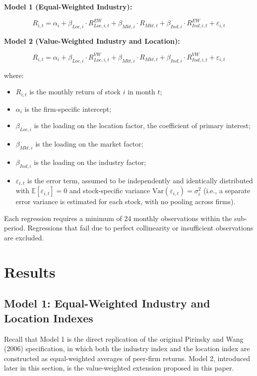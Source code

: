 \documentclass[
  12pt,
]{article}
\providecommand{\tightlist}{%
  \setlength{\itemsep}{0pt}\setlength{\parskip}{0pt}}
\begin{document}
\textbf{Model 1 (Equal-Weighted Industry):}

\[R_{i,t} = \alpha_i + \beta_{Loc,i} \cdot R_{Loc,i,t}^{EW} + \beta_{Mkt,i} \cdot R_{Mkt,t} + \beta_{Ind,i} \cdot R_{Ind,i,t}^{EW} + \varepsilon_{i,t} \tag{1}\]

\textbf{Model 2 (Value-Weighted Industry and Location):}

\[R_{i,t} = \alpha_i + \beta_{Loc,i} \cdot R_{Loc,i,t}^{VW} + \beta_{Mkt,i} \cdot R_{Mkt,t} + \beta_{Ind,i} \cdot R_{Ind,i,t}^{VW} + \varepsilon_{i,t} \tag{2}\]

\noindent where:

\begin{itemize}
\tightlist
\item
  \(R_{i,t}\) is the monthly return of stock \(i\) in month \(t\);
\item
  \(\alpha_i\) is the firm-specific intercept;
\item
  \(\beta_{Loc,i}\) is the loading on the location factor, the
  coefficient of primary interest;
\item
  \(\beta_{Mkt,i}\) is the loading on the market factor;
\item
  \(\beta_{Ind,i}\) is the loading on the industry factor;
\item
  \(\varepsilon_{i,t}\) is the error term, assumed to be independently
  and identically distributed with \(\mathbb{E}[\varepsilon_{i,t}] = 0\)
  and stock-specific variance
  \(\mathrm{Var}(\varepsilon_{i,t}) = \sigma^2_i\) (i.e., a separate
  error variance is estimated for each stock, with no pooling across
  firms).
\end{itemize}

Each regression requires a minimum of 24 monthly observations within the
sub-period. Regressions that fail due to perfect collinearity or
insufficient observations are excluded.

\section{Results}\label{results}

\subsection{Model 1: Equal-Weighted Industry and Location
Indexes}\label{model-1-equal-weighted-industry-and-location-indexes}

Recall that Model 1 is the direct replication of the original Pirinsky
and Wang (2006) specification, in which both the industry index and the
location index are constructed as equal-weighted averages of peer-firm
returns. Model 2, introduced later in this section, is the
value-weighted extension proposed in this paper.
\end{document}
